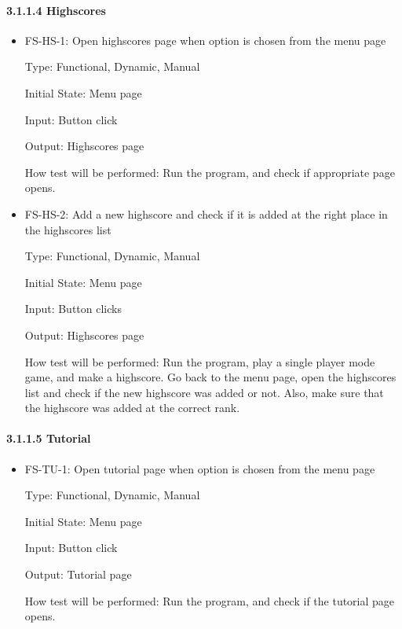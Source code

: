 \documentclass[12pt,letterpaper]{article}
\begin{document}
	\paragraph{3.1.1.4 Highscores}
\begin{reqbox}
	\begin{itemize}
	\item FS-HS-1: Open highscores page when option is chosen from the menu page

	Type: Functional, Dynamic, Manual	

	Initial State: Menu page

	Input: Button click 

	Output: Highscores page

	How test will be performed: Run the program, and check if appropriate page opens.
	\end{itemize}
\end{reqbox}

\begin{reqbox}
	\begin{itemize}
	\item FS-HS-2: Add a new highscore and check if it is added at the right place in the highscores list

	Type: Functional, Dynamic, Manual

	Initial State: Menu page

	Input: Button clicks 

	Output: Highscores page

	How test will be performed: Run the program, play a single player mode game, and make a highscore. Go back to the menu page, open the highscores list and check if the new highscore was added or not. Also, make sure that the highscore was added at the correct rank.
	\end{itemize}
\end{reqbox}

	\paragraph{3.1.1.5 Tutorial}
\begin{reqbox}
	\begin{itemize}
	\item FS-TU-1: Open tutorial page when option is chosen from the menu page

	Type: Functional, Dynamic, Manual

	Initial State: Menu page

	Input: Button click 

	Output: Tutorial page

	How test will be performed: Run the program, and check if the tutorial page opens.
	\end{itemize}
\end{reqbox}
\end{document}
